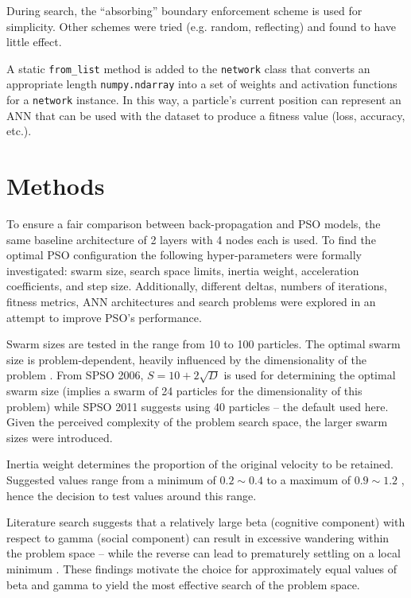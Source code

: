\documentclass[12pt]{article}
\begin{document}
During search, the ``absorbing'' \cite{Chu} boundary enforcement scheme is used
for simplicity. Other schemes were tried (e.g. random, reflecting) and
found to have little effect.

A static \texttt{from\_list} method is added to the \texttt{network}
class that converts an appropriate length \texttt{numpy.ndarray}
into a set of weights and activation functions for a \texttt{network} instance. In this way, a particle's current position
can represent an ANN that can be used with the dataset to produce a
fitness value (loss, accuracy, etc.).


\vspace{-1.5em}
\section{Methods}
\vspace{-1.5em}

To ensure a fair comparison between back-propagation and PSO models, the same baseline architecture of 2 layers with 4 nodes each is used. To find the optimal PSO configuration the following hyper-parameters were formally investigated: swarm size, search space limits, inertia weight, acceleration coefficients, and step size. Additionally, different deltas, numbers of iterations, fitness metrics, ANN architectures and search problems were explored in an attempt to improve PSO's performance.

Swarm sizes are tested in the range from 10 to 100 particles. The optimal swarm size is problem-dependent, heavily influenced by the dimensionality of the problem \cite{Razee}. From SPSO 2006, \(S = 10 + 2\sqrt{D}\) is used for determining the optimal swarm size (implies a swarm of 24 particles for the dimensionality of this problem) while SPSO 2011 suggests using 40 particles \cite{Clerc} -- the default used here. Given the perceived complexity of the problem search space, the larger swarm sizes were introduced.

Inertia weight determines the proportion of the original velocity to be retained. Suggested values range from a minimum of \(0.2\sim0.4\) to a maximum of \(0.9\sim1.2\) \cite{Razee} \cite{Gudise}, hence the decision to test values around this range.

Literature search suggests that a relatively large beta (cognitive component) with respect to gamma (social component) can result in excessive wandering within the problem space -- while the reverse can lead to prematurely settling on a local minimum \cite{Kennedy}. These findings motivate the choice for approximately equal values of beta and gamma to yield the most effective search of the problem space.
\end{document}
